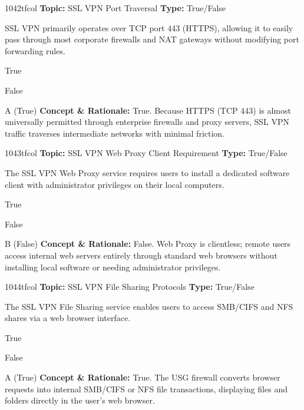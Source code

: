 \begin{qcard}{1042}{tfcol}
\textcolor{darkslate!75}{\small\textbf{Topic:} SSL VPN Port Traversal \hfill \textbf{Type:} True/False}\vspace{0.4em}\par
SSL VPN primarily operates over TCP port 443 (HTTPS), allowing it to easily pass through most corporate firewalls and NAT gateways without modifying port forwarding rules.
\begin{qoptions}
\item True
\item False
\end{qoptions}
\end{qcard}
\nopagebreak
\begin{explainbox}{A (True)}
\textbf{Concept \& Rationale:} True. Because HTTPS (TCP 443) is almost universally permitted through enterprise firewalls and proxy servers, SSL VPN traffic traverses intermediate networks with minimal friction.
\end{explainbox}

\begin{qcard}{1043}{tfcol}
\textcolor{darkslate!75}{\small\textbf{Topic:} SSL VPN Web Proxy Client Requirement \hfill \textbf{Type:} True/False}\vspace{0.4em}\par
The SSL VPN Web Proxy service requires users to install a dedicated software client with administrator privileges on their local computers.
\begin{qoptions}
\item True
\item False
\end{qoptions}
\end{qcard}
\nopagebreak
\begin{explainbox}{B (False)}
\textbf{Concept \& Rationale:} False. Web Proxy is clientless; remote users access internal web servers entirely through standard web browsers without installing local software or needing administrator privileges.
\end{explainbox}

\begin{qcard}{1044}{tfcol}
\textcolor{darkslate!75}{\small\textbf{Topic:} SSL VPN File Sharing Protocols \hfill \textbf{Type:} True/False}\vspace{0.4em}\par
The SSL VPN File Sharing service enables users to access SMB/CIFS and NFS shares via a web browser interface.
\begin{qoptions}
\item True
\item False
\end{qoptions}
\end{qcard}
\nopagebreak
\begin{explainbox}{A (True)}
\textbf{Concept \& Rationale:} True. The USG firewall converts browser requests into internal SMB/CIFS or NFS file transactions, displaying files and folders directly in the user's web browser.
\end{explainbox}

